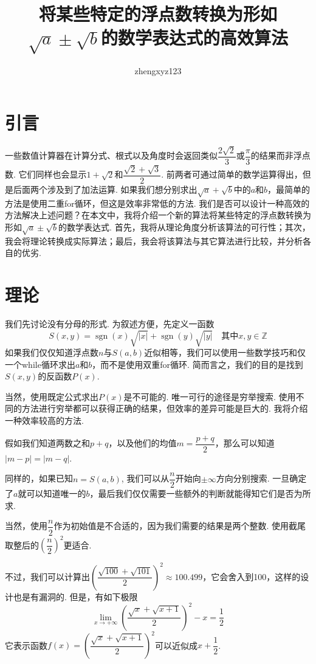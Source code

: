 \documentclass[a4paper, UTF8]{ctexart}
\title{将某些特定的浮点数转换为形如$\sqrt{a}\pm\sqrt{b}$的数学表达式的高效算法}
\author{zhengxyz123}
\DeclareMathOperator{\sgn}{\mathrm{sgn}}
\begin{document}
\maketitle

\section{引言}
一些数值计算器在计算分式、根式以及角度时会返回类似$\dfrac{2\sqrt{2}}{3}$或$\dfrac{\pi}{3}$的结果而非浮点数. 它们同样也会显示$1+\sqrt{2}$和$\dfrac{\sqrt{2}+\sqrt{3}}{2}$. 前两者可通过简单的数学运算得出，但是后面两个涉及到了加法运算. 如果我们想分别求出$\sqrt{a}+\sqrt{b}$中的$a$和$b$，最简单的方法是使用二重for循环，但这是效率非常低的方法. 我们是否可以设计一种高效的方法解决上述问题？在本文中，我将介绍一个新的算法将某些特定的浮点数转换为形如$\sqrt{a}\pm\sqrt{b}$的数学表达式. 首先，我将从理论角度分析该算法的可行性；其次，我会将理论转换成实际算法；最后，我会将该算法与其它算法进行比较，并分析各自的优劣.

\section{理论}
我们先讨论没有分母的形式. 为叙述方便，先定义一函数\[S(x,y)=\sgn(x)\sqrt{|x|}+\sgn(y)\sqrt{|y|} \quad\mbox{其中}x,y\in\mathbb{Z}\]如果我们仅仅知道浮点数$n$与$S(a,b)$近似相等，我们可以使用一些数学技巧和仅一个while循环求出$a$和$b$，而不是使用双重for循环. 简而言之，我们的目的是找到$S(x,y)$的反函数$P(x)$.

当然，使用既定公式求出$P(x)$是不可能的. 唯一可行的途径是穷举搜索. 使用不同的方法进行穷举都可以获得正确的结果，但效率的差异可能是巨大的. 我将介绍一种效率较高的方法.

假如我们知道两数之和$p+q$，以及他们的均值$m=\dfrac{p+q}{2}$，那么可以知道$|m-p|=|m-q|$.

同样的，如果已知$n=S(a,b)$, 我们可以从$\dfrac{n}{2}$开始向$\pm\infty$方向分别搜索. 一旦确定了$a$就可以知道唯一的$b$，最后我们仅仅需要一些额外的判断就能得知它们是否为所求.

当然，使用$\dfrac{n}{2}$作为初始值是不合适的，因为我们需要的结果是两个整数. 使用截尾取整后的$\left(\dfrac{n}{2}\right)^2$更适合.

不过，我们可以计算出$\left(\dfrac{\sqrt{100}+\sqrt{101}}{2}\right)^2\approx100.499$，它会舍入到100，这样的设计也是有漏洞的. 但是，有如下极限\[\lim_{x\to+\infty}\left(\frac{\sqrt{x}+\sqrt{x+1}}{2}\right)^2-x=\frac{1}{2}\]它表示函数$f(x)=\left(\dfrac{\sqrt{x}+\sqrt{x+1}}{2}\right)^2$可以近似成$x+\dfrac{1}{2}$.
\end{document}
